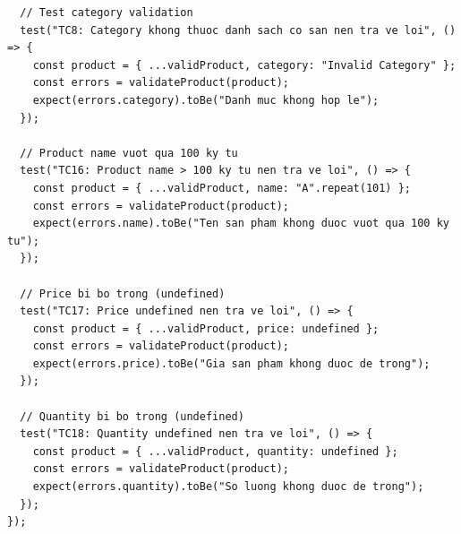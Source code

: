\documentclass[a4paper,12pt]{article}
\begin{document}
\begin{tcolorbox}[breakable, colback=green!5,colframe=black!50,title=productValidation.test.js]
\begin{lstlisting}
  // Test category validation
  test("TC8: Category khong thuoc danh sach co san nen tra ve loi", () => {
    const product = { ...validProduct, category: "Invalid Category" };
    const errors = validateProduct(product);
    expect(errors.category).toBe("Danh muc khong hop le");
  });

  // Product name vuot qua 100 ky tu
  test("TC16: Product name > 100 ky tu nen tra ve loi", () => {
    const product = { ...validProduct, name: "A".repeat(101) };
    const errors = validateProduct(product);
    expect(errors.name).toBe("Ten san pham khong duoc vuot qua 100 ky tu");
  });

  // Price bi bo trong (undefined)
  test("TC17: Price undefined nen tra ve loi", () => {
    const product = { ...validProduct, price: undefined };
    const errors = validateProduct(product);
    expect(errors.price).toBe("Gia san pham khong duoc de trong");
  });

  // Quantity bi bo trong (undefined)
  test("TC18: Quantity undefined nen tra ve loi", () => {
    const product = { ...validProduct, quantity: undefined };
    const errors = validateProduct(product);
    expect(errors.quantity).toBe("So luong khong duoc de trong");
  });
});

\end{lstlisting}
\end{tcolorbox}
\end{document}
